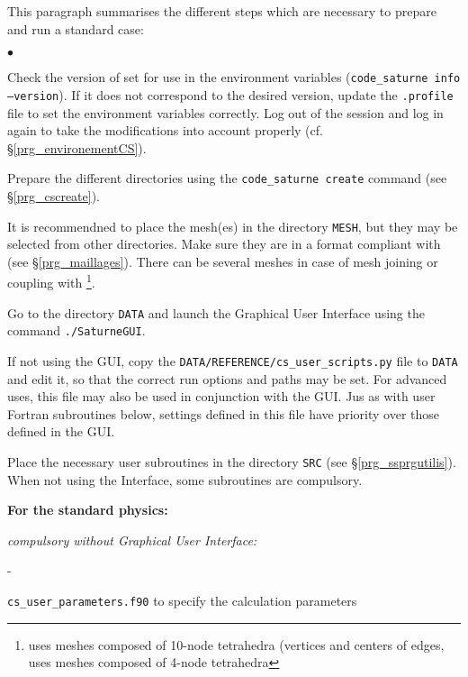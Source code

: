 {{{This paragraph summarises the different steps which are necessary to
prepare and run a standard case:

\begin{list}{$\bullet$}{}

\item Check the version of \CS set for use in the environment variables
(\texttt{code\_saturne~info --version}). If it does not correspond to
the desired version, update the \texttt{.profile} file to set the environment
variables correctly. Log out of the session and
log in again to take the modifications into account properly (cf.
\S\ref{prg_environementCS}).

\item Prepare the different directories using the \texttt{code\_saturne~create}
command (see \S\ref{prg_cscreate}).

\item It is recommendned to place the mesh(es) in the directory \texttt{MESH},
but they may be selected from other directories. Make sure they are
in a format compliant with \CS (see \S\ref{prg_maillages}). There can be
several meshes in case of mesh joining or coupling with
\syrthes\footnote{ uses meshes composed of 10-node tetrahedra (vertices
and centers of edges,  uses meshes composed of 4-node tetrahedra}.

\item Go to the directory \texttt{DATA} and launch the
      Graphical User Interface using the command \texttt{./SaturneGUI}.

\item If not using the GUI, copy the
  \texttt{DATA/REFERENCE/cs\_user\_scripts.py} file to \texttt{DATA} and
  edit it, so that the correct run options and paths may be set. For advanced
  uses, this file may also be used in conjunction with the GUI. Jus as with
  user Fortran subroutines below, settings defined in this file have priority
  over those defined in the GUI.

\item Place the necessary user subroutines in the directory \texttt{SRC} (see
\S\ref{prg_ssprgutilis}). When not using the Interface, some subroutines are
compulsory.

\begin{list}{}{}

\item {\bf For the standard physics:}

    \begin{list}{}{}
        \item {\em compulsory without Graphical User Interface:}
        \begin{list}{-}{}
            \item \texttt{cs\_user\_parameters.f90} to specify the calculation parameters


\end{list}
\end{list}
\end{list}
\end{list}}}}
